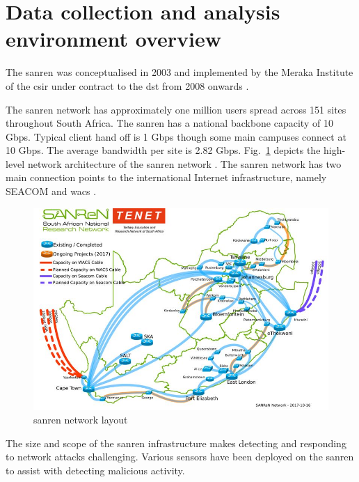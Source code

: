 \section{Data collection and analysis environment overview}
\label{sec3}

The \gls{sanren} was conceptualised in 2003 and implemented by the Meraka Institute of the \gls{csir} under contract to the \gls{dst} from 2008 onwards  \cite{draai2015implementing}. 


The \gls{sanren} network has approximately one million users spread across 151 sites throughout South Africa. The \gls{sanren} has a national backbone capacity of 10 Gbps. Typical client hand off is 1 Gbps though some main campuses connect at 10 Gbps. The average bandwidth per site is 2.82 Gbps. Fig.~\ref{fig:SANREN_net} depicts the high-level network architecture of the \gls{sanren} network  \cite{draai2015implementing}. The \gls{sanren} network has two main connection points to the international Internet infrastructure, namely SEACOM and \gls{wacs} \cite{draai2015implementing}.

\begin{figure}[h]
    \centering
    \includegraphics[width=\columnwidth]{section_3/SANREN_Net.JPG}
    \caption{\gls{sanren} network layout \cite{draai2015implementing}}
    \label{fig:SANREN_net}
\end{figure}

The size and scope of the \gls{sanren} infrastructure makes detecting and responding to network attacks challenging. Various sensors have been deployed on the \gls{sanren} to assist with detecting malicious activity.


